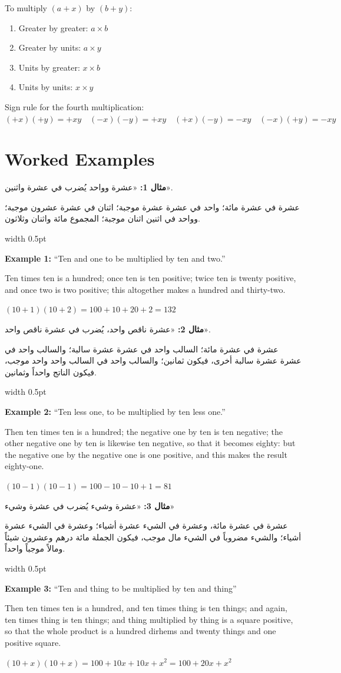 \documentclass[10pt,a4paper]{book}
\newlength{\colwidth}
\newcommand{\bilingualpair}[2]{%
  \noindent
  \begin{minipage}[t]{\colwidth}
  \begin{flushright}
  \vspace{0pt}
  {\arabicfont\small #1}
  \end{flushright}
  \end{minipage}%
  \hfill\textcolor{columnsepclr}{\vrule width 0.5pt}\hfill
  \begin{minipage}[t]{\colwidth}
  \vspace{0pt}
  {\small #2}
  \end{minipage}%
  \par\vspace{0.6em}
}
\begin{document}
\vspace{0.5em}
\begin{mathbox}[title={\textbf{The Fourfold Multiplication Rule}}]
To multiply $(a + x)$ by $(b + y)$:
\begin{enumerate}[label=\arabic*.,leftmargin=2em]
  \item Greater by greater: $a \times b$
  \item Greater by units: $a \times y$
  \item Units by greater: $x \times b$
  \item Units by units: $x \times y$
\end{enumerate}
Sign rule for the fourth multiplication:
$(+x)(+y) = +xy \quad (-x)(-y) = +xy \quad (+x)(-y) = -xy \quad (-x)(+y) = -xy$
\end{mathbox}
\vspace{0.5em}

\section{Worked Examples}

\bilingualpair{
\textbf{مثال 1:} «عشرة وواحد يُضرب في عشرة واثنين».

عشرة في عشرة مائة؛ واحد في عشرة عشرة موجبة؛ اثنان في عشرة
عشرون موجبة؛ وواحد في اثنين اثنان موجبة؛ المجموع مائة
واثنان وثلاثون.
}{
\textbf{Example 1:} ``Ten and one to be multiplied by ten and two.''

Ten times ten is a hundred; once ten is ten positive; twice ten is twenty
positive, and once two is two positive; this altogether makes a hundred and
thirty-two.

$(10 + 1)(10 + 2) = 100 + 10 + 20 + 2 = 132$
}

\bilingualpair{
\textbf{مثال 2:} «عشرة ناقص واحد، يُضرب في عشرة ناقص واحد».

عشرة في عشرة مائة؛ السالب واحد في عشرة عشرة سالبة؛ والسالب
واحد في عشرة عشرة سالبة أخرى، فيكون ثمانين؛ والسالب واحد
في السالب واحد واحد موجب، فيكون الناتج واحداً وثمانين.
}{
\textbf{Example 2:} ``Ten less one, to be multiplied by ten less one.''

Then ten times ten is a hundred; the negative one by ten is ten negative; the
other negative one by ten is likewise ten negative, so that it becomes
eighty: but the negative one by the negative one is one positive, and this
makes the result eighty-one.

$(10 - 1)(10 - 1) = 100 - 10 - 10 + 1 = 81$
}

\bilingualpair{
\textbf{مثال 3:} «عشرة وشيء يُضرب في عشرة وشيء»

عشرة في عشرة مائة، وعشرة في الشيء عشرة أشياء؛ وعشرة في
الشيء عشرة أشياء؛ والشيء مضروباً في الشيء مال موجب، فيكون
الجملة مائة درهم وعشرون شيئاً ومالاً موجباً واحداً.
}{
\textbf{Example 3:} ``Ten and thing to be multiplied by ten and thing''

Then ten times ten is a hundred, and ten times thing is ten things; and
again, ten times thing is ten things; and thing multiplied by thing is a
square positive, so that the whole product is a hundred dirhems and twenty
things and one positive square.

$(10 + x)(10 + x) = 100 + 10x + 10x + x^2 = 100 + 20x + x^2$
}
\end{document}
